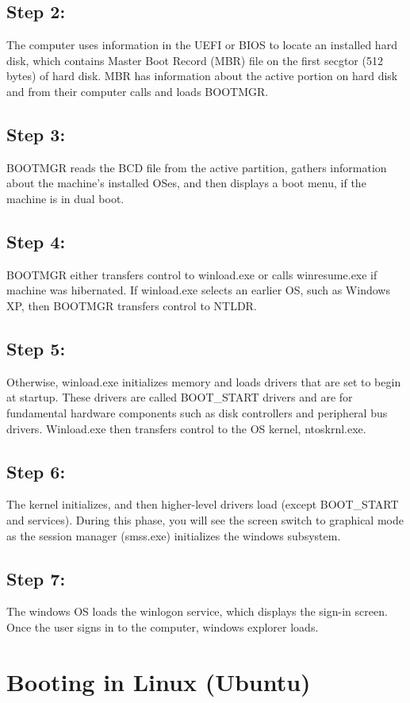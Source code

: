 \documentclass[]{report}
\begin{document}
\subsection{Step 2:}
The computer uses information in the UEFI or BIOS to locate an installed hard disk, which contains Master Boot Record (MBR) file on the first secgtor (512 bytes) of hard disk. MBR has information about the active portion on hard disk and from their computer calls and loads BOOTMGR.
\subsection{Step 3:}
BOOTMGR reads the BCD file from the active partition, gathers information about the machine's installed OSes, and then displays a boot menu, if the machine is in dual boot.
\subsection{Step 4:}
BOOTMGR either transfers control to winload.exe or calls winresume.exe if machine was hibernated. If winload.exe selects an earlier OS, such as Windows XP, then BOOTMGR transfers control to NTLDR.
\subsection{Step 5:}
Otherwise, winload.exe initializes memory and loads drivers that are set to begin at startup. These drivers are called BOOT\_START drivers and are for fundamental hardware components such as disk controllers and peripheral bus drivers. Winload.exe then transfers control to the OS kernel, ntoskrnl.exe.
\subsection{Step 6:}
The kernel initializes, and then higher-level drivers load (except BOOT\_START and services). During this phase, you will see the screen switch to graphical mode as the session manager (smss.exe) initializes the windows subsystem.
\subsection{Step 7:}
The windows OS loads the winlogon service, which displays the sign-in screen. Once the user signs in to the computer, windows explorer loads.

\section{Booting in Linux (Ubuntu)}
\end{document}

